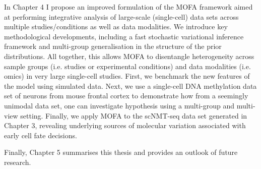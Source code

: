 In Chapter 4 I propose an improved formulation of the MOFA framework aimed at performing integrative analysis of large-scale (single-cell) data sets across multiple studies/conditions as well as data modalities. We introduce key methodological developments, including a fast stochastic variational inference framework and multi-group generalisation in the structure of the prior distributions. All together, this allows MOFA to  disentangle heterogeneity across sample groups (i.e. studies or experimental conditions) and data modalities (i.e. omics) in very large single-cell studies. First, we benchmark the new features of the model using simulated data. Next, we use a single-cell DNA methylation data set of neurons from mouse frontal cortex to demonstrate how from a seemingly unimodal data set, one can investigate hypothesis using a multi-group and multi-view setting. Finally, we apply MOFA to the scNMT-seq data set generated in Chapter 3, revealing underlying sources of molecular variation associated with early cell fate decisions.

Finally, Chapter 5 summarises this thesis and provides an outlook of future research.
